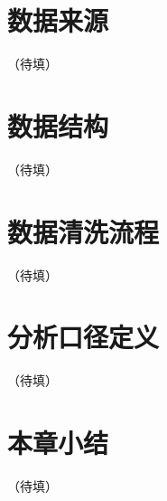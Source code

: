 
\section{数据来源}
（待填）

\section{数据结构}
（待填）

\section{数据清洗流程}
（待填）

\section{分析口径定义}
（待填）

\section{本章小结}
（待填）
